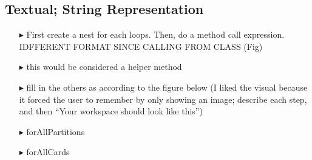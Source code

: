 \newpage
\subsection{Textual; String Representation}
\texHeader
\hypertarget{stringRep tex}{}

\begin{itemize}
  
\item[$\blacktriangleright$] First create a nest for each loops. Then, do a method call expression. IDFFERENT FORMAT SINCE CALLING FROM CLASS (Fig)

\item[$\blacktriangleright$] this would be considered a helper method

\item[$\blacktriangleright$] fill in the others as according to the figure below  (I liked the visual because it forced the user to remember by only showing an
image; describe each step, and then ``Your workspace should look like this'')

\item[$\blacktriangleright$] forAllPartitions

\item[$\blacktriangleright$] forAllCards
  
\end{itemize}